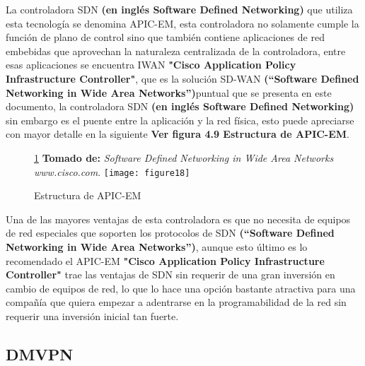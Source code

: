 La controladora SDN \textbf{(en inglés Software Defined Networking)} que utiliza esta tecnología se denomina APIC-EM, esta controladora no solamente cumple la función de plano de control sino que también contiene aplicaciones de red embebidas que aprovechan la naturaleza centralizada de la controladora, entre esas aplicaciones se encuentra IWAN \textbf{"Cisco Application Policy Infrastructure Controller"}, que es la solución SD-WAN \textbf{(“Software Defined Networking in Wide Area Networks”)}puntual que se presenta en este documento, la controladora SDN \textbf{(en inglés Software Defined Networking)} sin embargo es el puente entre la aplicación y la red física, esto puede apreciarse con mayor detalle en la siguiente \textbf{Ver figura 4.9 Estructura de APIC-EM}.
\begin{figure}[htbp]
\ref{fig:cisco} \textbf{Tomado de:} \textit{Software Defined Networking in Wide Area Networks www.cisco.com}.
  \centering
    {\texttt{[image: figure18]}}%
  \caption{Estructura de APIC-EM}
  \label{fig:cisco}
\end{figure}

Una de las mayores ventajas de esta controladora es que no necesita de equipos de red especiales que soporten los protocolos de SDN \textbf{(“Software Defined Networking in Wide Area Networks”)}, aunque esto último es lo recomendado el APIC-EM \textbf{"Cisco Application Policy Infrastructure Controller"} trae las ventajas de SDN sin requerir de una gran inversión en cambio de equipos de red, lo que lo hace una opción bastante atractiva para una compañía que quiera empezar a adentrarse en la programabilidad de la red sin requerir una inversión inicial tan fuerte.


\subsection{DMVPN}

